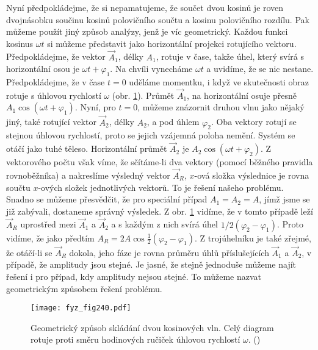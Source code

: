 {    Nyní předpokládejme, že si nepamatujeme, že součet dvou kosinů je roven dvojnásobku součinu 
    kosinů polovičního součtu a kosinu polovičního rozdílu. Pak můžeme použít jiný způsob analýzy, 
    jenž je víc geometrický. Každou funkci kosinus \(\omega t\) si můžeme představit jako 
    horizontální projekci rotujícího vektoru. Předpokládejme, že vektor \(\vec{A}_1\), délky 
    \(A_1\), rotuje v čase, takže úhel, který svírá s horizontální osou je \(\omega t + 
    \varphi_1\). Na chvíli vynecháme \(\omega t\) a uvidíme, že se nic nestane. Předpokládejme, že 
    v čase \(t=0\) uděláme momentku, i když ve skutečnosti obraz rotuje s úhlovou rychlostí 
    \(\omega\) (obr. \ref{fyz:fig240}). Průmět \(\vec{A}_1\), na horizontální osuje přesně 
    \(A_1\cos(\omega t + \varphi_1)\). Nyní, pro \(t = 0\), můžeme znázornit druhou vlnu jako 
    nějaký jiný, také rotující vektor \(\vec{A}_2\), délky \(A_2\), a pod úhlem \(\varphi_2\). Oba 
    vektory rotují se stejnou úhlovou rychlostí, proto se jejich vzájemná poloha nemění. Systém se 
    otáčí jako tuhé těleso. Horizontální průmět \(\vec{A}_2\) je \(A_2\cos(\omega t + \varphi_2)\). 
    Z vektorového počtu však víme, že sčítáme-li dva vektory (pomocí běžného pravidla rovnoběžníka) 
    a nakreslíme výsledný vektor \(\vec{A}_R\), \(x\)-ová složka výslednice je rovna součtu 
    \(x\)-ových složek jednotlivých vektorů. To je řešení našeho problému. Snadno se můžeme 
    přesvědčit, že pro speciální případ \(A_1 = A_2 = A\), jímž jsme se již zabývali, dostaneme 
    správný výsledek. Z obr. \ref{fyz:fig240} vidíme, že v tomto případě leží \(\vec{A}_R\) 
    uprostřed mezi \(\vec{A}_1\) a \(\vec{A}_2\) a s každým z nich svírá úhel \(1/2(\varphi_2 - 
    \varphi_1)\). Proto vidíme, že jako předtím \(A_R = 2A\cos\frac{1}{2}(\varphi_2 - \varphi_1)\). 
    Z trojúhelníku je také zřejmé, že otáčí-li se \(\vec{A}_R\) dokola, jeho fáze je rovna průměru 
    úhlů příslušejících \(\vec{A}_1\) a \(\vec{A}_2\), v případě, že amplitudy jsou stejné. Je
    jasné, že stejně jednoduše můžeme najít řešení i pro případ, kdy amplitudy nejsou stejné. To 
    můžeme nazvat geometrickým způsobem řešení problému.
    
    \begin{figure}[ht!] %
      \centering
      \texttt{[image: fyz\_fig240.pdf]}
      \caption{Geometrický způsob skládání dvou kosinových vln. Celý diagram rotuje proti směru 
               hodinových ručiček úhlovou rychlostí \(\omega\).
               (\cite[s.~387]{Feynman01})}
      \label{fyz:fig240}
    \end{figure}
    
}
